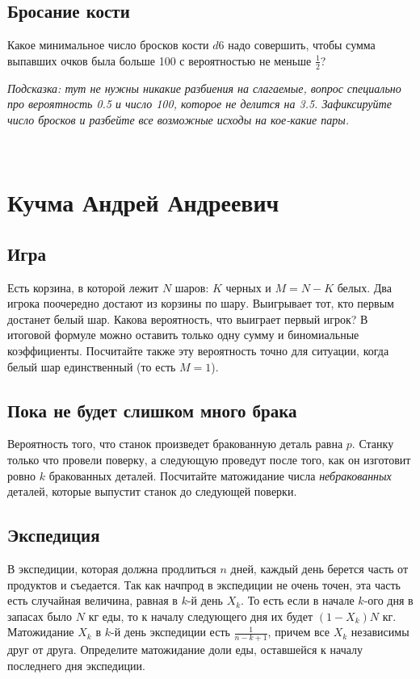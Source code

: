 \documentclass[12pt]{article}
\begin{document}
\subsection{Бросание кости}
Какое минимальное число бросков кости $d6$ надо совершить, чтобы сумма выпавших очков была больше 100 с вероятностью не меньше $\frac{1}{2}$? 

\emph{Подсказка: тут не нужны никакие разбиения на слагаемые, вопрос специально про вероятность 0.5 и число 100, которое не делится на 3.5. Зафиксируйте число бросков и разбейте все возможные исходы на кое-какие пары.}

\newpage
~
\newpage
\section{Кучма Андрей Андреевич}

\subsection{Игра}
Есть корзина, в которой лежит $N$ шаров: $K$ черных и $M = N - K$ белых. Два игрока поочередно достают из корзины по шару. Выигрывает тот, кто первым достанет белый шар. Какова вероятность, что выиграет первый игрок? В итоговой формуле можно оставить только одну сумму и биномиальные коэффициенты. Посчитайте также эту вероятность точно для ситуации, когда белый шар единственный (то есть $M = 1$).

\subsection{Пока не будет слишком много брака}
Вероятность того, что станок произведет бракованную деталь равна $p$. Станку только что провели поверку, а следующую проведут после того, как он изготовит ровно $k$ бракованных деталей. Посчитайте матожидание числа \emph{небракованных} деталей, которые выпустит станок до следующей поверки.

\subsection{Экспедиция}
В экспедиции, которая должна продлиться $n$ дней, каждый день берется часть от продуктов и съедается. Так как начпрод в экспедиции не очень точен, эта часть есть случайная величина, равная в $k$-й день $X_k$. То есть если в начале $k$-ого дня в запасах было $N$ кг еды, то к началу следующего дня их будет $(1 - X_k)N$ кг. Матожидание $X_k$ в $k$-й день экспедиции есть $\frac{1}{n - k + 1}$, причем все $X_k$ независимы друг от друга. Определите матожидание доли еды, оставшейся к началу последнего дня экспедиции.
\end{document}

